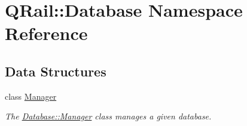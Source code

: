 \hypertarget{namespaceQRail_1_1Database}{}\section{Q\+Rail\+::Database Namespace Reference}
\label{namespaceQRail_1_1Database}
\subsection*{Data Structures}
\begin{DoxyCompactItemize}
\item 
class \mbox{\hyperlink{classQRail_1_1Database_1_1Manager}{Manager}}
\begin{DoxyCompactList}\small\item\em The \mbox{\hyperlink{classQRail_1_1Database_1_1Manager}{Database\+::\+Manager}} class manages a given database. \end{DoxyCompactList}\end{DoxyCompactItemize}
